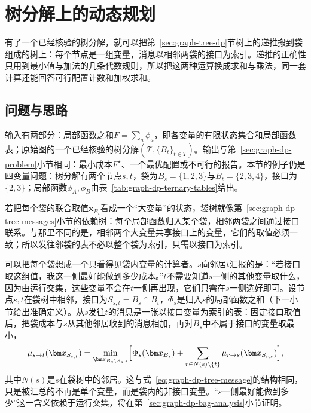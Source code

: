 
\section{树分解上的动态规划}
\label{sec:graph-bag-dp}

有了一个已经核验的树分解，就可以把第~\ref{sec:graph-tree-dp}节树上的递推搬到袋组成的树上：每个节点是一组变量，消息以相邻两袋的接口为索引。递推的正确性只用到最小值与加法的几条代数规则，所以把这两种运算换成求和与乘法，同一套计算还能回答可行配置计数和加权求和。

\subsection{问题与思路}
\label{sec:graph-dp-bag-idea}

输入有两部分：局部函数之和$F=\sum_a\phi_a$，即各变量的有限状态集合和局部函数表；原始图的一个已经核验的树分解$(\mathcal T,\{B_t\}_{t\in T})$。输出与第~\ref{sec:graph-dp-problem}小节相同：最小成本$F^\star$、一个最优配置或不可行的报告。本节的例子仍是四变量问题：树分解有两个节点$s,t$，袋为$B_s=\{1,2,3\}$与$B_t=\{2,3,4\}$，接口为$\{2,3\}$；局部函数$\phi_A,\phi_B$由表~\ref{tab:graph-dp-ternary-tables}给出。

若把每个袋的联合取值$\bm x_{B_t}$看成一个“大变量”的状态，袋树就像第~\ref{sec:graph-dp-tree-messages}小节的依赖树：每个局部函数归入某个袋，相邻两袋之间通过接口联系。与那里不同的是，相邻两个大变量共享接口上的变量，它们的取值必须一致；所以发往邻袋的表不必以整个袋为索引，只需以接口为索引。

可以把每个袋想成一个只看得见袋内变量的计算者。$s$向邻居$t$汇报的是：“若接口取这组值，我这一侧最好能做到多少成本。”$t$不需要知道$s$一侧的其他变量取什么，因为由运行交集，这些变量不会在$t$一侧再出现，它们只需在$s$一侧选好即可。设节点$s,t$在袋树中相邻，接口为$S_{s,t}=B_s\cap B_t$，$\Phi_s$是归入$s$的局部函数之和（下一小节给出准确定义）。从$s$发往$t$的消息是一张以接口变量为索引的表：固定接口取值后，把袋成本与$s$从其他邻居收到的消息相加，再对$B_s$中不属于接口的变量取最小，
\begin{equation}
\mu_{s\to t}(\bm x_{S_{s,t}})=\min_{\bm x_{B_s\setminus S_{s,t}}}\Bigl[\Phi_s(\bm x_{B_s})+\sum_{r\in N(s)\setminus\{t\}}\mu_{r\to s}(\bm x_{S_{r,s}})\Bigr],
\label{eq:graph-dp-bag-message}
\end{equation}
其中$N(s)$是$s$在袋树中的邻居。这与式~\eqref{eq:graph-dp-tree-message}的结构相同，只是被汇总的不再是单个变量，而是袋内的非接口变量。“$s$一侧最好能做到多少”这一含义依赖于运行交集，将在第~\ref{sec:graph-dp-bag-analysis}小节证明。

